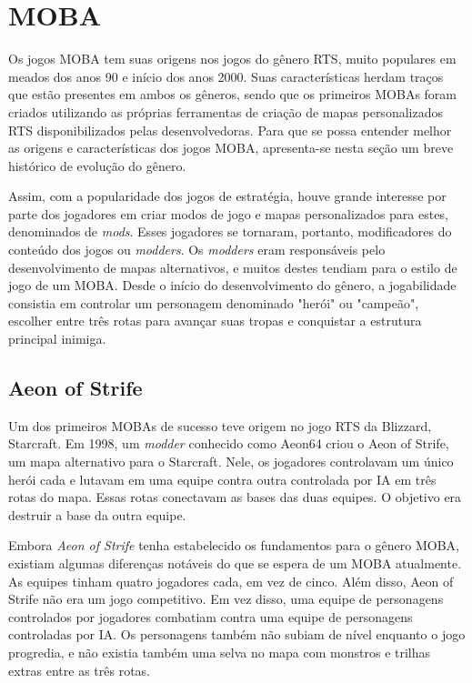 \section{MOBA}
Os jogos MOBA tem suas origens nos jogos do gênero RTS, muito populares em meados dos anos 90 e início dos anos 2000. Suas características herdam traços que estão presentes em ambos os gêneros, sendo que os primeiros MOBAs foram criados utilizando as próprias ferramentas de criação de mapas personalizados RTS disponibilizados pelas desenvolvedoras. Para que se possa entender melhor as origens e características dos jogos MOBA, apresenta-se nesta seção um breve histórico de evolução do gênero.

Assim, com a popularidade dos jogos de estratégia, houve grande interesse por parte dos jogadores em criar modos de jogo e mapas personalizados para estes, denominados de \textit{mods}. Esses jogadores se tornaram, portanto, modificadores do conteúdo dos jogos ou \textit{modders}. Os \textit{modders} eram responsáveis pelo desenvolvimento de mapas alternativos, e muitos destes tendiam para o estilo de jogo de um MOBA. Desde o início do desenvolvimento do gênero, a jogabilidade consistia em controlar um personagem denominado "herói" ou "campeão", escolher entre três rotas para avançar suas tropas e conquistar a estrutura principal inimiga.

\subsection{Aeon of Strife}
Um dos primeiros MOBAs de sucesso teve origem no jogo RTS da Blizzard, Starcraft. Em 1998, um \textit{modder} conhecido como Aeon64 criou o Aeon of Strife, um mapa alternativo para o Starcraft. Nele, os jogadores controlavam um único herói cada e lutavam em uma equipe contra outra controlada por IA em três rotas do mapa. Essas rotas conectavam as bases das duas equipes. O objetivo era destruir a base da outra equipe.

Embora \textit{Aeon of Strife} tenha estabelecido os fundamentos para o gênero MOBA, existiam algumas diferenças notáveis do que se espera de um MOBA atualmente. As equipes tinham quatro jogadores cada, em vez de cinco. Além disso, Aeon of Strife não era um jogo competitivo. Em vez disso, uma equipe de personagens controlados por jogadores combatiam contra uma equipe de personagens controladas por IA. Os personagens também não subiam de nível enquanto o jogo progredia, e não existia também uma selva no mapa com monstros e trilhas extras entre as três rotas.

